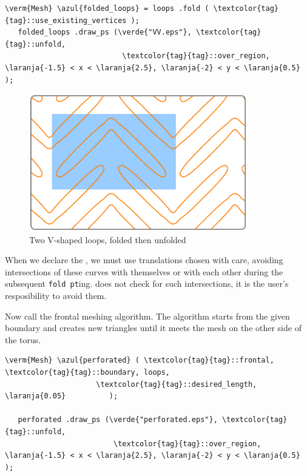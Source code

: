 \begin{Verbatim}[commandchars=\\\{\},formatcom=\small\tt,frame=single,
   rulecolor=\color{moldura},baselinestretch=0.94,framesep=2mm         ]
   \verm{Mesh} \azul{folded_loops} = loops .fold ( \textcolor{tag}{tag}::use_existing_vertices );
   folded_loops .draw_ps (\verde{"VV.eps"}, \textcolor{tag}{tag}::unfold,
                           \textcolor{tag}{tag}::over_region, \laranja{-1.5} < x < \laranja{2.5}, \laranja{-2} < y < \laranja{0.5} );
\end{Verbatim}

\begin{figure}[ht] \centering
  \includegraphics[width=95mm]{boomerang-2.eps}
  \caption{Two V-shaped loops, folded then unfolded}
  \label{\numb section 7.\numb fig 20}
\end{figure}

When we declare the {\small\tt{}}, we must use translations chosen with care,
avoiding intersections of these curves with themselves or with each other during the subsequent
\mbox{{\small\tt fold pt}ing}.
\ManiFEM{} does not check for such intersections, it is the user's resposibility to avoid them.

Now call the frontal meshing algorithm.
The algorithm starts from the given boundary and creates new triangles until
it meets the mesh on the other side of the torus.

\begin{Verbatim}[commandchars=\\\{\},formatcom=\small\tt,frame=single,
   label=code not working,rulecolor=\color{moldura},
   baselinestretch=0.94,framesep=2mm                                  ]
   \verm{Mesh} \azul{perforated} ( \textcolor{tag}{tag}::frontal, \textcolor{tag}{tag}::boundary, loops,
                     \textcolor{tag}{tag}::desired_length, \laranja{0.05}          );

   perforated .draw_ps (\verde{"perforated.eps"}, \textcolor{tag}{tag}::unfold,
                         \textcolor{tag}{tag}::over_region, \laranja{-1.5} < x < \laranja{2.5}, \laranja{-2} < y < \laranja{0.5} );
\end{Verbatim}

